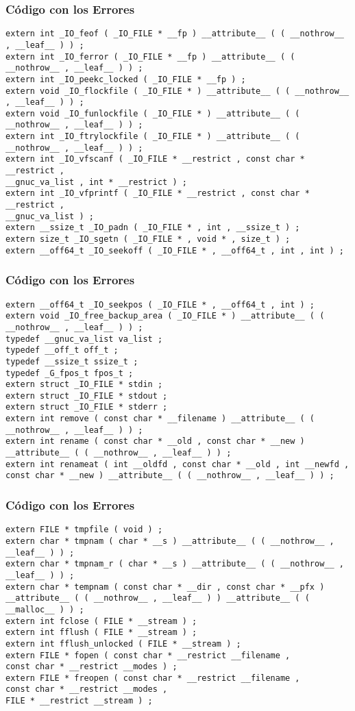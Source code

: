 \documentclass{beamer}
\begin{document}
\begin{frame}[fragile]
\frametitle{C\'odigo con los Errores}
\begin{lstlisting}[style=CStyle]
extern int _IO_feof ( _IO_FILE * __fp ) __attribute__ ( ( __nothrow__ , __leaf__ ) ) ; 
extern int _IO_ferror ( _IO_FILE * __fp ) __attribute__ ( ( __nothrow__ , __leaf__ ) ) ; 
extern int _IO_peekc_locked ( _IO_FILE * __fp ) ; 
extern void _IO_flockfile ( _IO_FILE * ) __attribute__ ( ( __nothrow__ , __leaf__ ) ) ; 
extern void _IO_funlockfile ( _IO_FILE * ) __attribute__ ( ( __nothrow__ , __leaf__ ) ) ; 
extern int _IO_ftrylockfile ( _IO_FILE * ) __attribute__ ( ( __nothrow__ , __leaf__ ) ) ; 
extern int _IO_vfscanf ( _IO_FILE * __restrict , const char * __restrict , 
__gnuc_va_list , int * __restrict ) ; 
extern int _IO_vfprintf ( _IO_FILE * __restrict , const char * __restrict , 
__gnuc_va_list ) ; 
extern __ssize_t _IO_padn ( _IO_FILE * , int , __ssize_t ) ; 
extern size_t _IO_sgetn ( _IO_FILE * , void * , size_t ) ; 
extern __off64_t _IO_seekoff ( _IO_FILE * , __off64_t , int , int ) ; 
\end{lstlisting}
\end{frame}
\begin{frame}[fragile]
\frametitle{C\'odigo con los Errores}
\begin{lstlisting}[style=CStyle]
extern __off64_t _IO_seekpos ( _IO_FILE * , __off64_t , int ) ; 
extern void _IO_free_backup_area ( _IO_FILE * ) __attribute__ ( ( __nothrow__ , __leaf__ ) ) ; 
typedef __gnuc_va_list va_list ; 
typedef __off_t off_t ; 
typedef __ssize_t ssize_t ; 
typedef _G_fpos_t fpos_t ; 
extern struct _IO_FILE * stdin ; 
extern struct _IO_FILE * stdout ; 
extern struct _IO_FILE * stderr ; 
extern int remove ( const char * __filename ) __attribute__ ( ( __nothrow__ , __leaf__ ) ) ; 
extern int rename ( const char * __old , const char * __new ) __attribute__ ( ( __nothrow__ , __leaf__ ) ) ; 
extern int renameat ( int __oldfd , const char * __old , int __newfd , 
const char * __new ) __attribute__ ( ( __nothrow__ , __leaf__ ) ) ; 
\end{lstlisting}
\end{frame}
\begin{frame}[fragile]
\frametitle{C\'odigo con los Errores}
\begin{lstlisting}[style=CStyle]
extern FILE * tmpfile ( void ) ; 
extern char * tmpnam ( char * __s ) __attribute__ ( ( __nothrow__ , __leaf__ ) ) ; 
extern char * tmpnam_r ( char * __s ) __attribute__ ( ( __nothrow__ , __leaf__ ) ) ; 
extern char * tempnam ( const char * __dir , const char * __pfx ) 
__attribute__ ( ( __nothrow__ , __leaf__ ) ) __attribute__ ( ( __malloc__ ) ) ; 
extern int fclose ( FILE * __stream ) ; 
extern int fflush ( FILE * __stream ) ; 
extern int fflush_unlocked ( FILE * __stream ) ; 
extern FILE * fopen ( const char * __restrict __filename , 
const char * __restrict __modes ) ; 
extern FILE * freopen ( const char * __restrict __filename , 
const char * __restrict __modes , 
FILE * __restrict __stream ) ; 
\end{lstlisting}
\end{frame}
\end{document}
